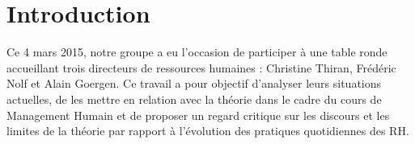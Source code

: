 \section*{Introduction}

Ce 4 mars 2015, notre groupe a eu l'occasion de participer à une table ronde accueillant trois directeurs de ressources humaines : Christine Thiran, Frédéric Nolf et Alain Goergen. Ce travail a pour objectif d'analyser leurs situations actuelles, de les mettre en relation avec la théorie dans le cadre du cours de Management Humain et de proposer un regard critique sur les discours et les limites de la théorie par rapport à l'évolution des pratiques quotidiennes des RH. \newline